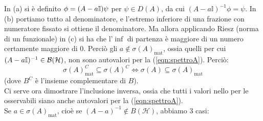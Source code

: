 \documentclass[../../FisicaTeorica.tex]{subfiles}
\begin{document}
In (a) si è definito $\phi = (A-a\mathbb{I})\psi$ per $\psi \in D\left(A\right)$, da cui $\left(A-a\mathbb{I}\right)^{-1}\phi =\psi$. In (b) portiamo tutto al denominatore, e l'estremo inferiore di una frazione con numeratore fissato si ottiene  il denominatore. Ma allora applicando Riesz (norma di un funzionale) in (c) si ha che l'$\inf$ di partenza è maggiore di un numero certamente maggiore di $0$. Perciò gli $a \notin \sigma(A)_{\text{mat}}$, ossia quelli per cui $(A-a\mathbb{I})^{-1}\in\mathcal{B}(\mathcal{H})$, non sono autovalori per la (\ref{eqn:spettroA}). Perciò:
\[
\sigma(A)_{\text{mat}}^C \subseteq \sigma(A)^C \Leftrightarrow \sigma(A) \subseteq \sigma(A)_{\text{mat}}
\]
(dove $B^C$ è l'insieme complementare di $B$).\\
Ci serve ora dimostrare l'inclusione inversa, ossia che tutti i valori nello  per le osservabili siano anche autovalori per la (\ref{eqn:spettroA}).\\
Se $a\in\sigma(A)_{\text{mat}}$, cioè se $\left(A-a\right)^{-1}\notin B\left(\mathcal{H}\right)$,  abbiamo 3 casi:
\end{document}
